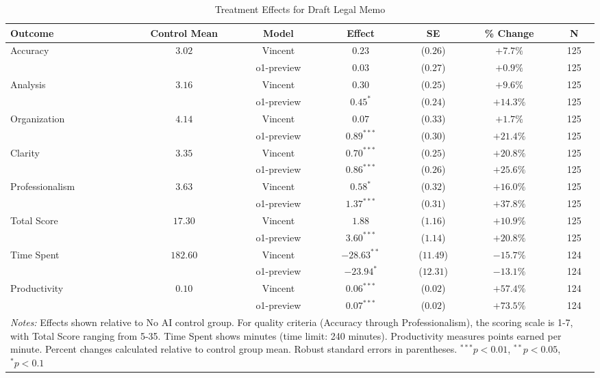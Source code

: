 \begin{table}[!htbp]
\centering
\caption{Treatment Effects for Draft Legal Memo}
\label{tab:task2_effects}
\begin{tabular}{lcccccc}
\hline\hline
Outcome & Control Mean & Model & Effect & SE & \% Change & N \\
\hline
\multirow{2}{*}{Accuracy} & \multirow{2}{*}{$3.02$} & Vincent & $0.23$ & ($0.26$) & $+7.7\%$ & 125 \\
& & o1-preview & $0.03$ & ($0.27$) & $+0.9\%$ & 125 \\
\hline
\multirow{2}{*}{Analysis} & \multirow{2}{*}{$3.16$} & Vincent & $0.30$ & ($0.25$) & $+9.6\%$ & 125 \\
& & o1-preview & $0.45^{*}$ & ($0.24$) & $+14.3\%$ & 125 \\
\hline
\multirow{2}{*}{Organization} & \multirow{2}{*}{$4.14$} & Vincent & $0.07$ & ($0.33$) & $+1.7\%$ & 125 \\
& & o1-preview & $0.89^{***}$ & ($0.30$) & $+21.4\%$ & 125 \\
\hline
\multirow{2}{*}{Clarity} & \multirow{2}{*}{$3.35$} & Vincent & $0.70^{***}$ & ($0.25$) & $+20.8\%$ & 125 \\
& & o1-preview & $0.86^{***}$ & ($0.26$) & $+25.6\%$ & 125 \\
\hline
\multirow{2}{*}{Professionalism} & \multirow{2}{*}{$3.63$} & Vincent & $0.58^{*}$ & ($0.32$) & $+16.0\%$ & 125 \\
& & o1-preview & $1.37^{***}$ & ($0.31$) & $+37.8\%$ & 125 \\
\hline
\multirow{2}{*}{Total Score} & \multirow{2}{*}{$17.30$} & Vincent & $1.88$ & ($1.16$) & $+10.9\%$ & 125 \\
& & o1-preview & $3.60^{***}$ & ($1.14$) & $+20.8\%$ & 125 \\
\hline
\multirow{2}{*}{Time Spent} & \multirow{2}{*}{$182.60$} & Vincent & $-28.63^{**}$ & ($11.49$) & $-15.7\%$ & 124 \\
& & o1-preview & $-23.94^{*}$ & ($12.31$) & $-13.1\%$ & 124 \\
\hline
\multirow{2}{*}{Productivity} & \multirow{2}{*}{$0.10$} & Vincent & $0.06^{***}$ & ($0.02$) & $+57.4\%$ & 124 \\
& & o1-preview & $0.07^{***}$ & ($0.02$) & $+73.5\%$ & 124 \\
\hline
\multicolumn{7}{p{0.95\linewidth}}{\footnotesize \textit{Notes:} Effects shown relative to No AI control group. For quality criteria (Accuracy through Professionalism), the scoring scale is 1-7, with Total Score ranging from 5-35. Time Spent shows minutes (time limit: 240 minutes). Productivity measures points earned per minute. Percent changes calculated relative to control group mean. Robust standard errors in parentheses. $^{***}p<0.01$, $^{**}p<0.05$, $^{*}p<0.1$}
\end{tabular}
\end{table}